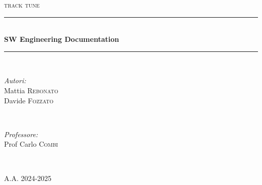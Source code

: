 \begin{titlepage}
    $ $
    \vspace{5pt}
    \newcommand{\HRule}{\rule{\linewidth}{0.5mm}}
    \begin{center}
    \textsc{\normalsize track tune}\\[1cm]
    \end{center}
    
    \center
     
    
    \HRule \\[0.4cm]
    { \huge \bfseries SW Engineering Documentation}\\[0.4cm] %
    \HRule \\[1.5cm]
     
    
    \begin{minipage}{0.4\textwidth}
    \begin{flushleft} \large
    \emph{Autori:}\\
    Mattia \textsc{Rebonato} \\
    Davide \textsc{Fozzato}\\
    \end{flushleft}
    \end{minipage}
    ~
    \begin{minipage}{0.4\textwidth}
    \begin{flushright} \large
    \emph{Professore:} \\
    Prof Carlo \textsc{Combi}
    \end{flushright}
    \end{minipage}\\[2cm]
    
    \vspace{250pt}
    
    \textsc{\normalsize A.A. 2024-2025}\\[0.5cm]
    
    \vfill %
    \end{titlepage}